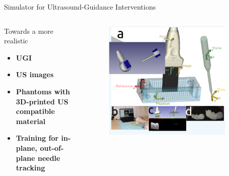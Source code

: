 {
\begin{frame}{Simulator for Ultrasound-Guidance Interventions}

  \begin{columns}
    \begin{column}{.3\linewidth}
      Towards a more realistic
  \begin{itemize}
    \item \textbf{UGI}
    \item \textbf{US images}
    \item \textbf{Phantoms with 3D-printed US compatible material}
    \item \textbf{Training for in-plane, out-of-plane needle tracking}
  \end{itemize}

    \end{column}


  \begin{column}{.6\linewidth}

      \begin{figure}
        \centering
        \includegraphics[width=0.9\textwidth]{./figures/sugi/plan-simulator-for-ugi/versions/drawing-v02.png}
      \end{figure}

    \end{column}
  \end{columns}

\end{frame}
}